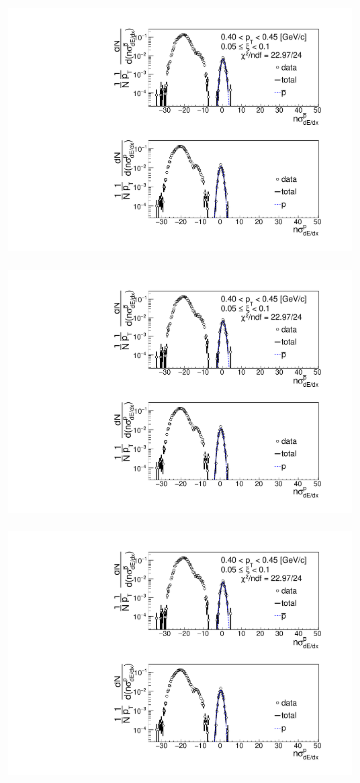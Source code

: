\begin{figure}[h!]
	\centering
	\begin{subfigure}{.32\textwidth}
		\includegraphics[width=\linewidth, page=1]{chapters/chrgSTAR/img/dEdx/fit2019_thirdStep_2_1.pdf}
	\end{subfigure}
	\begin{subfigure}{.32\textwidth}
		\includegraphics[width=\linewidth, page=2]{chapters/chrgSTAR/img/dEdx/fit2019_thirdStep_2_1.pdf}
	\end{subfigure}
	\begin{subfigure}{.32\textwidth}
		\includegraphics[width=\linewidth, page=3]{chapters/chrgSTAR/img/dEdx/fit2019_thirdStep_2_1.pdf}

\end{subfigure}
\end{figure}
